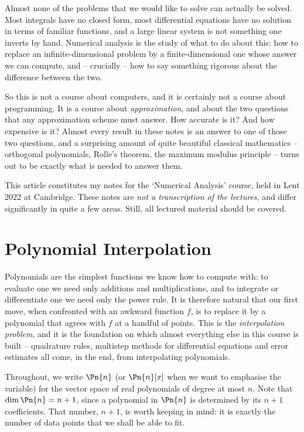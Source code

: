 



Almost none of the problems that we would like to solve can actually be solved. Most integrals have no closed form, most differential equations have no solution in terms of familiar functions, and a large linear system is not something one inverts by hand. Numerical analysis is the study of what to do about this: how to replace an infinite-dimensional problem by a finite-dimensional one whose answer we can compute, and -- crucially -- how to say something rigorous about the difference between the two.

So this is not a course about computers, and it is certainly not a course about programming. It is a course about \emph{approximation}, and about the two questions that any approximation scheme must answer. How accurate is it? And how expensive is it? Almost every result in these notes is an answer to one of those two questions, and a surprising amount of quite beautiful classical mathematics -- orthogonal polynomials, Rolle's theorem, the maximum modulus principle -- turns out to be exactly what is needed to answer them.

This article constitutes my notes for the `Numerical Analysis' course, held in Lent 2022 at Cambridge. These notes are \emph{not a transcription of the lectures}, and differ significantly in quite a few areas. Still, all lectured material should be covered.





\section{Polynomial Interpolation}

Polynomials are the simplest functions we know how to compute with: to evaluate one we need only additions and multiplications, and to integrate or differentiate one we need only the power rule. It is therefore natural that our first move, when confronted with an awkward function $f$, is to replace it by a polynomial that agrees with $f$ at a handful of points. This is the \emph{interpolation problem}, and it is the foundation on which almost everything else in this course is built -- quadrature rules, multistep methods for differential equations and error estimates all come, in the end, from interpolating polynomials.

Throughout, we write $\Pn{n}$ (or $\Pn{n}[x]$ when we want to emphasise the variable) for the vector space of real polynomials of degree at most $n$. Note that $\dim \Pn{n} = n + 1$, since a polynomial in $\Pn{n}$ is determined by its $n + 1$ coefficients. That number, $n+1$, is worth keeping in mind: it is exactly the number of data points that we shall be able to fit.

